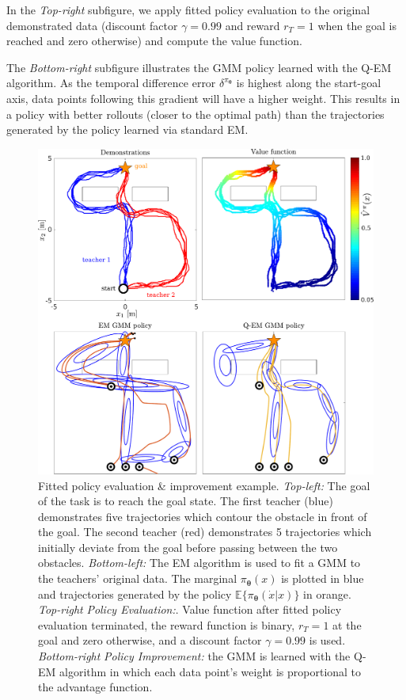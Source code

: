 \documentclass[final,5p,times,twocolumn]{elsarticle}
\newcommand{\X}{x}
\newcommand{\U}{\dot{x}}
\newcommand{\Param}{\boldsymbol{\theta}}
\begin{document}
In the \textit{Top-right} subfigure, we apply fitted policy evaluation to the original demonstrated data (discount 
factor $\gamma=0.99$ and reward $r_{T}=1$ when the goal is reached and zero otherwise) and compute the value function.

The \textit{Bottom-right} subfigure illustrates the GMM policy learned with the Q-EM algorithm. As 
the temporal difference error $\delta^{\pi_{\Param}}$ is highest along the start-goal axis, data points
following this gradient will have a higher weight. This results in a policy with better 
rollouts (closer to the optimal path) than the trajectories generated by the policy learned via standard EM. 

\begin{figure}
 \centering
 \setlength\fboxsep{0pt}
  \setlength\fboxrule{0.25pt}
  \includegraphics[width=\linewidth]{./Figure/fpe_example.pdf}
 \caption{Fitted policy evaluation \& improvement example. 
  \textit{Top-left:} The goal of the task is to reach the goal state. The first teacher (blue) demonstrates 
  five trajectories which contour the obstacle in front of the goal. The second teacher (red) demonstrates 
  5 trajectories which initially deviate from the goal before passing between the two obstacles. 
  \textit{Bottom-left:} The EM algorithm is used to fit a GMM to the teachers' original data. 
  The marginal $\pi_{\Param}(\X)$ is plotted in blue and trajectories generated by the 
  policy $\mathbb{E}\{\pi_{\Param}(\U|\X)\}$ in orange. \textit{Top-right} \textit{Policy Evaluation:}.  
  Value function after fitted policy evaluation terminated, the reward function 
  is binary, $r_T=1$ at the goal and zero otherwise, and a discount factor $\gamma = 0.99$ is used.
  \textit{Bottom-right} \textit{Policy Improvement:} the GMM is learned with the Q-EM algorithm in which 
  each data point's weight is proportional to the advantage function.
 }
  \label{fig:fpe_example}
\end{figure}
\end{document}
